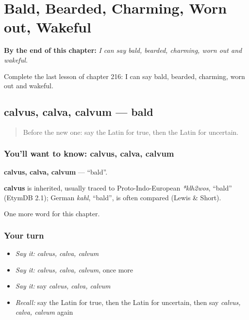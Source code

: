 
\chapter{Bald, Bearded, Charming, Worn out, Wakeful}
\label{ch:la-bald-bearded-charming-worn-out-wakeful}

\begin{chapteropening}
\textbf{By the end of this chapter:} \emph{I can say bald, bearded, charming, worn out and wakeful.}

Complete the last lesson of chapter 216: I can say bald, bearded, charming, worn out and wakeful.
\end{chapteropening}

\section[calvus, calva, calvum]{calvus, calva, calvum — bald}

\label{lesson:LA-C216-calvus}



\begin{quote}
Before the new one: say the Latin for true, then the Latin for uncertain.
\end{quote}

\subsection*{You'll want to know: calvus, calva, calvum}
\textbf{calvus, calva, calvum} — \textquotedblleft{}bald\textquotedblright{}.

\begin{cousinweb}
\textbf{calvus} is inherited, usually traced to Proto-Indo-European \emph{*klh2wos}, \textquotedblleft{}bald\textquotedblright{} (EtymDB 2.1); German \emph{kahl}, \textquotedblleft{}bald\textquotedblright{}, is often compared (Lewis \& Short).
\end{cousinweb}

\begin{grammarlens}[title={What you've built}]
One more word for this chapter.
\end{grammarlens}

\subsection*{Your turn}
\begin{itemize}
\raggedright
  \item \emph{Say it:} \emph{calvus, calva, calvum}
  \item \emph{Say it:} \emph{calvus, calva, calvum}, once more
  \item \emph{Say it:} say \emph{calvus, calva, calvum}
  \item \emph{Recall:} say the Latin for true, then the Latin for uncertain, then say \emph{calvus, calva, calvum} again
\end{itemize}

